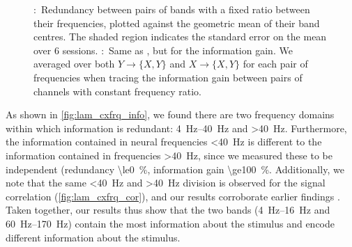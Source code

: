 \begin{figure}[htbp]
{\protect{}:~Redundancy between pairs of bands with a fixed ratio between their frequencies, plotted against the geometric mean of their band centres.
The shaded region indicates the standard error on the mean over \num{6} sessions.
\protect{}:~Same as \protect{}, but for the information gain.
We averaged over both $Y \to \{X,Y\}$ and $X \to \{X,Y\}$ for each pair of frequencies when tracing the information gain between pairs of channels with constant frequency ratio.
}%
\label{fig:lam_cxfrq_info}
%
\end{figure}

As shown in \autoref{fig:lam_cxfrq_info}, we found there are two frequency domains within which information is redundant: \SIrange{4}{40}{Hz} and \SI{>40}{Hz}.
Furthermore, the information contained in neural frequencies \SI{<40}{Hz} is different to the information contained in frequencies \SI{>40}{Hz}, since we measured these to be independent (redundancy \SI{\le0}{\percent}, information gain \SI{\ge100}{\percent}.
Additionally, we note that the same \SI{<40}{Hz} and \SI{>40}{Hz} division is observed for the signal correlation (\autoref{fig:lam_cxfrq_cor}), and our results corroborate earlier findings \citep{Belitski2008}.
Taken together, our results thus show that the two bands (\SIrange{4}{16}{Hz} and \SIrange{60}{170}{Hz}) contain the most information about the stimulus and encode different information about the stimulus.

